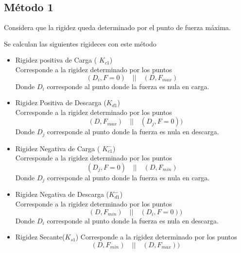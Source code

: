 \documentclass[a4paper, 11pt,article,oneside]{memoir}%
\begin{document}
\subsection{Método 1}\label{subsec:metodo 1}
Considera que la rigidez queda determinado por el punto de fuerza máxima. \par
Se calculan las siguientes rigideces con este método
\begin{itemize}
    \item Rigidez positiva de Carga ( $K_{c1}$)\\
    Corresponde a la rigidez determinado por los puntos
    $$ (D_i,F=0)\quad || \quad (D,F_{max})$$
    Donde $D_i$ corresponde al punto donde la fuerza es nula en carga.
    \item Rigidez Positiva de Descarga ($K_{d1}$)\\
     Corresponde a la rigidez determinado por los puntos
    $$ \quad (D,F_{max})\quad || \quad (D_j,F=0))$$
    Donde $D_j$ corresponde al punto donde la fuerza es nula en descarga.
    \item Rigidez Negativa de Carga ( $K^{-}_{c1}$)\\
    Corresponde a la rigidez determinado por los puntos
    $$ (D_j,F=0)\quad || \quad (D,F_{min})$$
    Donde $D_j$ corresponde al punto donde la fuerza es nula en carga.
     \item Rigidez Negativa de Descarga ($K^-_{d1}$)\\
     Corresponde a la rigidez determinado por los puntos
    $$ \quad (D,F_{min})\quad || \quad (D_i,F=0))$$
    Donde $D_i$ corresponde al punto donde la fuerza es nula en descarga.
    \item Rigidez Secante($K_{s1}$)
    Corresponde a la rigidez determinado por los puntos
    $$ \quad (D,F_{min})\quad || \quad (D,F_{max}))$$
    \end{itemize}
\end{document}
